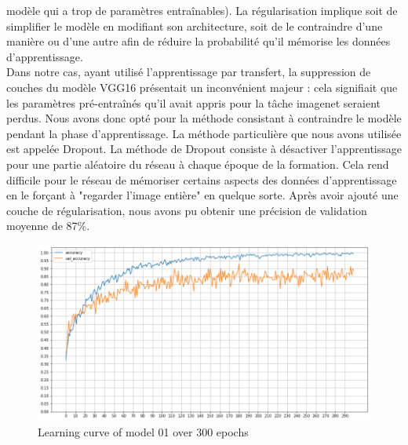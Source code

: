 \documentclass[11pt]{article}
\begin{document}
modèle qui a trop de paramètres entraînables). La régularisation implique soit
de simplifier le modèle en modifiant son architecture, soit de le contraindre
d'une manière ou d'une autre afin de réduire la probabilité qu'il mémorise les
données d'apprentissage.\\ Dans notre cas, ayant utilisé l'apprentissage par
transfert, la suppression de couches du modèle VGG16 présentait un inconvénient
majeur : cela signifiait que les paramètres pré-entraînés qu'il avait appris
pour la tâche imagenet seraient perdus. Nous avons donc opté pour la méthode
consistant à contraindre le modèle pendant la phase d'apprentissage. La méthode
particulière que nous avons utilisée est appelée Dropout. La méthode de Dropout
consiste à désactiver l'apprentissage pour une partie aléatoire du réseau à
chaque époque de la formation. Cela rend difficile pour le réseau de mémoriser
certains aspects des données d'apprentissage en le forçant à "regarder l'image
entière" en quelque sorte. Après avoir ajouté une couche de régularisation, nous
avons pu obtenir une précision de validation moyenne de 87\%.
\begin{figure}[H]
  \centering
  \includegraphics[scale=0.42]{image/model02.png}
  \caption{Learning curve of model 01 over 300 epochs}
\end{figure}
\end{document}
